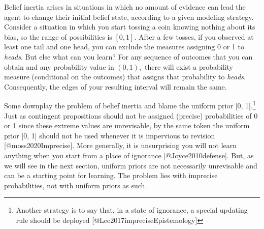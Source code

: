 \documentclass[
  letterpaper,
  DIV=11,
  numbers=noendperiod]{scrartcl}
\begin{document}
\noindent Belief inertia arises in situations in which no amount of
evidence can lead the agent to change their initial belief state,
according to a given modeling strategy. Consider a situation in which
you start tossing a coin knowing nothing about its bias, so the range of
possibilities is \([0,1]\). After a few tosses, if you observed at least
one tail and one head, you can exclude the measures assigning 0 or 1 to
\emph{heads}. But else what can you learn? For any sequence of outcomes
that you can obtain and any probability value in \((0, 1),\) there will
exist a probability measure (conditional on the outcomes) that assigns
that probability to \emph{heads}. Consequently, the edges of your
resulting interval will remain the same.

Some downplay the problem of belief inertia and blame the uniform prior
{[}0, 1{]}.\footnote{Another strategy is to say that, in a state of
  ignorance, a special updating rule should be deployed
  {[}@Lee2017impreciseEpistemology{]}} Just as contingent propositions
should not be assigned (precise) probabilities of 0 or 1 since these
extreme values are unrevisable, by the same token the uniform prior
{[}0, 1{]} should not be used whenever it is impervious to revision
{[}@moss2020Imprecise{]}. More generally, it is unsurprising you will
not learn anything when you start from a place of ignorance
{[}@Joyce2010defense{]}. But, as we will see in the next section,
uniform priors are not necessarily unrevisable and can be a starting
point for learning. The problem lies with imprecise probabilities, not
with uniform priors as such.
\end{document}
